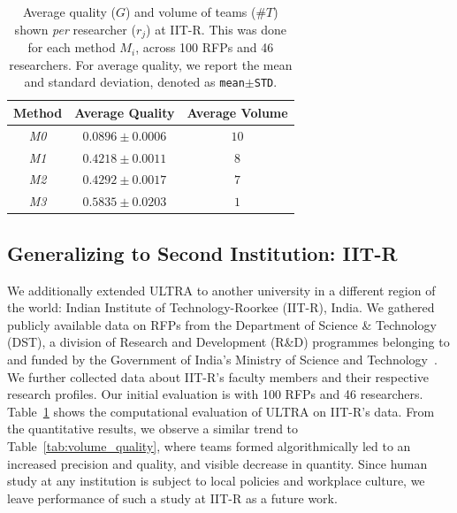 \begin{table}
    \centering
    \begin{tabular}{c|c|c}
    \toprule 
    Method  & Average Quality & Average Volume \\
    \midrule 
    \textit{M0} & $0.0896\pm0.0006$ & $10$ \\
    \textit{M1} & $0.4218\pm0.0011$ & $8$ \\
    \textit{M2} & $0.4292\pm0.0017$ & $7$ \\
    \textit{M3} & $0.5835\pm0.0203$ & $1$ \\
    \bottomrule
    \end{tabular}
    \caption{Average quality ($G$) and volume of teams (\#$T$) shown \textit{per} researcher ($r_j$) at IIT-R. This was done for each method $M_i$, across 100 RFPs and 46 researchers. For average quality, we report the mean and standard deviation, denoted as \texttt{mean$\pm$STD}.} \label{tab:volume_quality_iitr}
\end{table}

\subsection{Generalizing to Second Institution: IIT-R}
We additionally extended ULTRA to another university in a different region of the world: Indian Institute of Technology-Roorkee (IIT-R), India. We gathered publicly available data on RFPs from the Department of Science \& Technology (DST), a division of Research and Development (R\&D) programmes belonging to and funded by the Government of India's Ministry of Science and Technology~\cite{dst2023department}. We further collected data about IIT-R's faculty members and their respective research profiles. 
Our initial evaluation is with 100 RFPs and 46 researchers.
Table~\ref{tab:volume_quality_iitr} shows the computational evaluation of ULTRA on IIT-R's data. 
From the quantitative results, we observe a similar trend to Table~\ref{tab:volume_quality}, where teams formed algorithmically led to an increased precision and quality, and visible decrease in quantity.
Since human study at any institution is subject to local policies and workplace culture, we leave performance of such a study at IIT-R as a future work.

